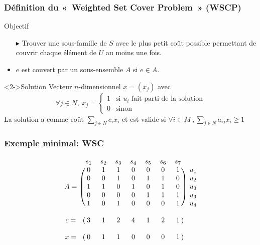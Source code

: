 \documentclass[aspectratio=169,11pt]{beamer}
\begin{document}
	\begin{frame}
		\frametitle{Définition du « Weighted Set Cover Problem » (WSCP)}
		\begin{block}{Objectif}
			\begin{itemize}
				\item[\alert{\(\blacktriangleright\)}] Trouver une sous-famille de \(S\) avec \alert{le plus petit coût} possible permettant de couvrir chaque élément de \(U\) au moins une fois.
				\item \(e\) est couvert par un sous-ensemble \(A\) si \(e \in A\).
			\end{itemize}
		\end{block}
		\begin{block}<2->{Solution}
			Vecteur \(n\)-dimensionnel \(x = \left(x_j\right)\) avec
			\[\forall j \in N,\ x_j = \left\{
				\begin{array}{ll}
					1 & \text{si } u_i \text{ fait parti de la solution}\\
					0 & \text{sinon}
				\end{array}
			\right.\]
			La solution a comme coût \(\sum_{j \in N}{c_i x_i}\) et est valide si
			\(\forall i \in M\ ,\sum_{j \in N}{a_{ij}x_i} \ge 1\)
		\end{block}
	\end{frame}


	\begin{frame}
		\frametitle{Exemple minimal: WSC}
		\[
		\begin{blockarray}{ccccccccc}
			& s_1 & s_2 & s_3 & s_4 & s_5 & s_6 & s_7 \\
			\begin{block}{c(ccccccc)c}
				    & 0 & 1 & 1 & 0 & 0 & 0 & 1 & u_1\\
				    & 0 & 0 & 1 & 0 & 1 & 1 & 0 & u_2\\
				A = & 1 & 1 & 0 & 1 & 0 & 1 & 0 & u_3\\
				    & 0 & 0 & 0 & 0 & 1 & 1 & 1 & u_3\\
				    & 1 & 0 & 1 & 0 & 0 & 0 & 1 & u_4\\
			\end{block}
			\\
			\begin{block}{c(ccccccc)c}
				c = & 3 & 1 & 2 & 4 & 1 & 2 & 1 &\\
			\end{block}
			\\
			\begin{block}{c(ccccccc)c}
				x = & 0 & 1 & 1 & 0 & 0 & 0 & 1 &\\
			\end{block}
		\end{blockarray}
		\]
	\end{frame}
\end{document}
